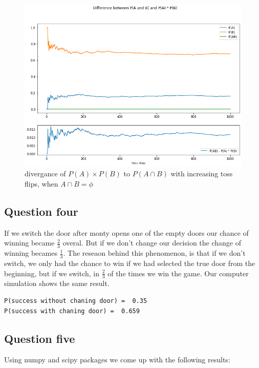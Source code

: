 \documentclass[12pt, a4paper]{book}
\begin{document}
\begin{figure}[h]
    \centering
    \includegraphics*[width=0.8\linewidth]{images/question3/diverge_pAB.png}
    \caption{divergance of $P(A)\times P(B)$ to $P(A\cap B)$ with increasing toss flips, when $A \cap B = \phi$}
    \label{question3_div_pAB}
\end{figure}

\clearpage

\subsection*{Question four}

If we switch the door after monty opens one of the empty doors our chance of winning became $\frac{2}{3}$ overal.
But if we don't change our decision the change of winning becames $\frac{1}{3}$. The reseaon behind this phenomenon,
is that if we don't switch, we only had the chance to win if we had selected the true door from the beginning, but
if we switch, in $\frac{2}{3}$ of the times we win the game. Our computer simulation shows the same result.

\begin{mdframed}
\begin{verbatim}
P(success without chaning door) =  0.35
P(success with chaning door) =  0.659
\end{verbatim}
\end{mdframed}


\clearpage

\subsection*{Question five}

Using numpy and scipy packages we come up with the following results:
\end{document}
